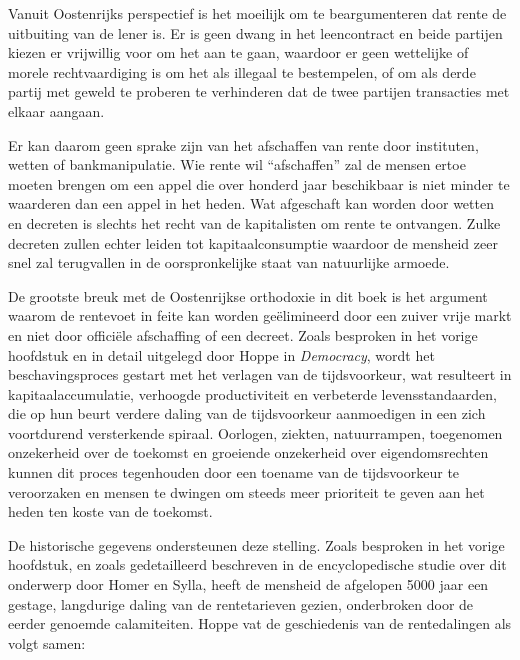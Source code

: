 Vanuit Oostenrijks perspectief is het moeilijk om te beargumenteren dat rente de uitbuiting van de lener is. Er is geen dwang in het leencontract en beide partijen kiezen er vrijwillig voor om het aan te gaan, waardoor er geen wettelijke of morele rechtvaardiging is om het als illegaal te bestempelen, of om als derde partij met geweld te proberen te verhinderen dat de twee partijen transacties met elkaar aangaan.

\begin{blockquotebox}
Er kan daarom geen sprake zijn van het afschaffen van rente door instituten, wetten of bankmanipulatie. Wie rente wil ``afschaffen'' zal de mensen ertoe moeten brengen om een appel die over honderd jaar beschikbaar is niet minder te waarderen dan een appel in het heden. Wat afgeschaft kan worden door wetten en decreten is slechts het recht van de kapitalisten om rente te ontvangen. Zulke decreten zullen echter leiden tot kapitaalconsumptie waardoor de mensheid zeer snel zal terugvallen in de oorspronkelijke staat van natuurlijke armoede.\footnotemark
\end{blockquotebox}

De grootste breuk met de Oostenrijkse orthodoxie in dit boek is het argument waarom de rentevoet in feite kan worden geëlimineerd door een zuiver vrije markt en niet door officiële afschaffing of een decreet. Zoals besproken in het vorige hoofdstuk en in detail uitgelegd door Hoppe in \emph{Democracy}, wordt het beschavingsproces gestart met het verlagen van de tijdsvoorkeur, wat resulteert in kapitaalaccumulatie, verhoogde productiviteit en verbeterde levensstandaarden, die op hun beurt verdere daling van de tijdsvoorkeur aanmoedigen in een zich voortdurend versterkende spiraal. Oorlogen, ziekten, natuurrampen, toegenomen onzekerheid over de toekomst en groeiende onzekerheid over eigendomsrechten kunnen dit proces tegenhouden door een toename van de tijdsvoorkeur te veroorzaken en mensen te dwingen om steeds meer prioriteit te geven aan het heden ten koste van de toekomst.

De historische gegevens ondersteunen deze stelling. Zoals besproken in het vorige hoofdstuk, en zoals gedetailleerd beschreven in de encyclopedische studie over dit onderwerp door Homer en Sylla, heeft de mensheid de afgelopen 5000 jaar een gestage, langdurige daling van de rentetarieven gezien, onderbroken door de eerder genoemde calamiteiten.\autocite{163} Hoppe vat de geschiedenis van de rentedalingen als volgt samen:

